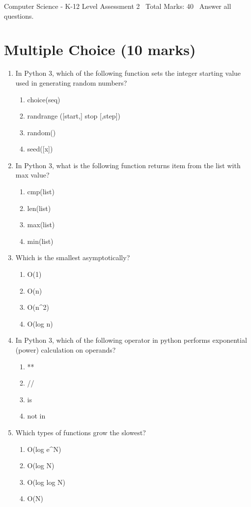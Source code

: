 \documentclass[12pt]{article}
\begin{document}
\begin{center}
Computer Science - K-12 Level Assessment 2 \
Total Marks: 40 \
Answer all questions.
\end{center}

\section*{Multiple Choice (10 marks)}
\begin{enumerate}[label=\arabic*.]
\item In Python 3, which of the following function sets the integer starting value used in
generating random numbers?
\begin{enumerate}[label=(\alph*)]
    \item choice(seq)
    \item randrange ([start,] stop [,step])
    \item random()
    \item seed([x])
\end{enumerate}
\item In Python 3, what is the following function returns item from the list with max value?
\begin{enumerate}[label=(\alph*)]
    \item cmp(list)
    \item len(list)
    \item max(list)
    \item min(list)
\end{enumerate}
\item Which is the smallest asymptotically?
\begin{enumerate}[label=(\alph*)]
    \item O(1)
    \item O(n)
    \item O(n\^{}2)
    \item O(log n)
\end{enumerate}
\item In Python 3, which of the following operator in python performs exponential (power)
calculation on operands?
\begin{enumerate}[label=(\alph*)]
    \item **
    \item //
    \item is
    \item not in
\end{enumerate}
\item Which types of functions grow the slowest?
\begin{enumerate}[label=(\alph*)]
    \item O(log e\^{}N)
    \item O(log N)
    \item O(log log N)
    \item O(N)
\end{enumerate}
\end{enumerate}
\end{document}
